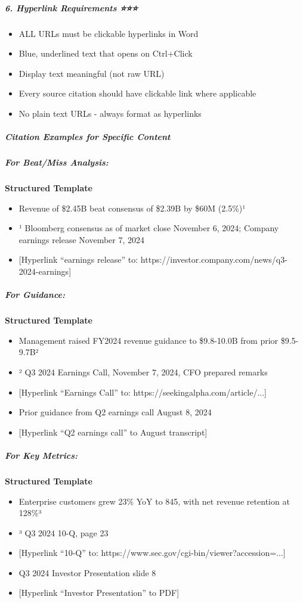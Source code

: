 \documentclass[11pt]{article}
\begin{document}
\subparagraph{6. Hyperlink Requirements ⭐⭐⭐}\mbox{}\par
\begin{itemize}[leftmargin=*,itemsep=2pt,topsep=2pt]
\item {} ALL URLs must be clickable hyperlinks in Word
\item {} Blue, underlined text that opens on Ctrl+Click
\item {} Display text meaningful (not raw URL)
\item {} Every source citation should have clickable link where applicable
\item {} No plain text URLs - always format as hyperlinks
\end{itemize}

\subparagraph{Citation Examples for Specific Content}\mbox{}\par

\subparagraph{For Beat/Miss Analysis:}\mbox{}\par
\textbf{Structured Template}
\begin{itemize}[leftmargin=*,itemsep=2pt,topsep=2pt]
\item {} Revenue of \$2.45B beat consensus of \$2.39B by \$60M (2.5\%)¹
\item {} ¹ Bloomberg consensus as of market close November 6, 2024; Company earnings release November 7, 2024
\item {} [Hyperlink ``earnings release'' to: https://investor.company.com/news/q3-2024-earnings]
\end{itemize}

\subparagraph{For Guidance:}\mbox{}\par
\textbf{Structured Template}
\begin{itemize}[leftmargin=*,itemsep=2pt,topsep=2pt]
\item {} Management raised FY2024 revenue guidance to \$9.8-10.0B from prior \$9.5-9.7B²
\item {} ² Q3 2024 Earnings Call, November 7, 2024, CFO prepared remarks
\item {} [Hyperlink ``Earnings Call'' to: https://seekingalpha.com/article/...]
\item {} Prior guidance from Q2 earnings call August 8, 2024
\item {} [Hyperlink ``Q2 earnings call'' to August transcript]
\end{itemize}

\subparagraph{For Key Metrics:}\mbox{}\par
\textbf{Structured Template}
\begin{itemize}[leftmargin=*,itemsep=2pt,topsep=2pt]
\item {} Enterprise customers grew 23\% YoY to 845, with net revenue retention at 128\%³
\item {} ³ Q3 2024 10-Q, page 23
\item {} [Hyperlink ``10-Q'' to: https://www.sec.gov/cgi-bin/viewer?accession=...]
\item {} Q3 2024 Investor Presentation slide 8
\item {} [Hyperlink ``Investor Presentation'' to PDF]
\end{itemize}
\end{document}
